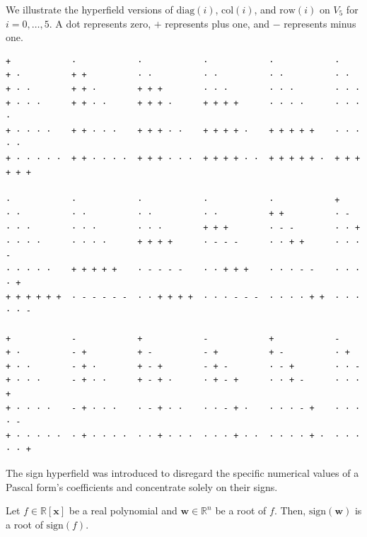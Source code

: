 \begin{example}\label{ex:sign-hyperfield03242}
    We illustrate the hyperfield versions of \( \mathrm{diag}(i) \), \( \mathrm{col}(i) \), and \( \mathrm{row}(i) \) on \( V_5 \) for \( i = 0, \dots, 5 \). A dot represents zero, \( + \) represents plus one, and \( - \) represents minus one.
    \begin{verbatim}
+            ·            ·            ·            ·            ·
+ ·          + +          · ·          · ·          · ·          · ·
+ · ·        + + ·        + + +        · · ·        · · ·        · · ·
+ · · ·      + + · ·      + + + ·      + + + +      · · · ·      · · · ·
+ · · · ·    + + · · ·    + + + · ·    + + + + ·    + + + + +    · · · · ·
+ · · · · ·  + + · · · ·  + + + · · ·  + + + + · ·  + + + + + ·  + + + + + +

·            ·            ·            ·            ·            +
· ·          · ·          · ·          · ·          + +          · -
· · ·        · · ·        · · ·        + + +        · - -        · · +
· · · ·      · · · ·      + + + +      · - - -      · · + +      · · · -
· · · · ·    + + + + +    · - - - -    · · + + +    · · · - -    · · · · +
+ + + + + +  · - - - - -  · · + + + +  · · · - - -  · · · · + +  · · · · · -

+            -            +            -            +            -
+ ·          - +          + -          - +          + -          · +
+ · ·        - + ·        + - +        - + -        · - +        · · -
+ · · ·      - + · ·      + - + ·      · + - +      · · + -      · · · +
+ · · · ·    - + · · ·    · - + · ·    · · - + ·    · · · - +    · · · · -
+ · · · · ·  · + · · · ·  · · + · · ·  · · · + · ·  · · · · + ·  · · · · · +
    \end{verbatim}
\end{example}


The sign hyperfield was introduced to disregard the specific numerical values of a Pascal form's coefficients and concentrate solely on their signs.

\begin{proposition}\label{prop:sign-sikjsfnf}
    Let \( f \in \mathbb{R}[\mathbf{x}] \) be a real polynomial and \( \mathbf{w} \in \mathbb{R}^n \) be a root of \( f \). Then, \( \mathrm{sign}(\mathbf{w}) \) is a root of \( \mathrm{sign}(f) \).
\end{proposition}

